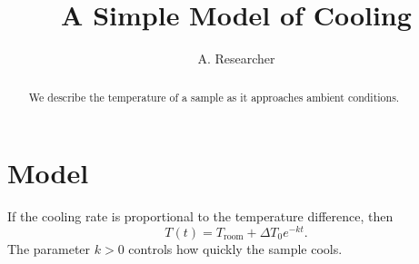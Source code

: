 \documentclass{article}
\title{A Simple Model of Cooling}
\author{A. Researcher}
\begin{document}
\maketitle

\begin{abstract}
We describe the temperature of a sample as it approaches ambient conditions.
\end{abstract}

\section{Model}
If the cooling rate is proportional to the temperature difference, then
\[
  T(t) = T_{\mathrm{room}} + \Delta T_0 e^{-kt}.
\]
The parameter \(k>0\) controls how quickly the sample cools.
\end{document}
